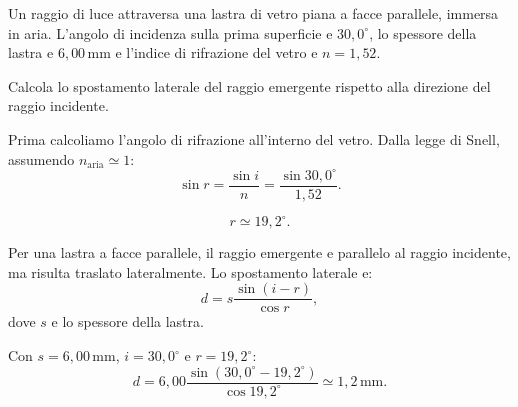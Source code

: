 
\begin{esercizio}
Un raggio di luce attraversa una lastra di vetro piana a facce parallele,
immersa in aria. L'angolo di incidenza sulla prima superficie e
\(30{,}0^\circ\), lo spessore della lastra e \(6{,}00\,\mathrm{mm}\) e
l'indice di rifrazione del vetro e \(n=1{,}52\).

Calcola lo spostamento laterale del raggio emergente rispetto alla direzione
del raggio incidente.
\end{esercizio}

\begin{soluzione}
Prima calcoliamo l'angolo di rifrazione all'interno del vetro. Dalla legge di
Snell, assumendo \(n_\text{aria}\simeq 1\):
\[
\sin r=\frac{\sin i}{n}
=\frac{\sin 30{,}0^\circ}{1{,}52}.
\]

\[
r\simeq 19{,}2^\circ.
\]

Per una lastra a facce parallele, il raggio emergente e parallelo al raggio
incidente, ma risulta traslato lateralmente. Lo spostamento laterale e:
\[
d=s\frac{\sin(i-r)}{\cos r},
\]
dove \(s\) e lo spessore della lastra.

Con \(s=6{,}00\,\mathrm{mm}\), \(i=30{,}0^\circ\) e
\(r=19{,}2^\circ\):
\[
d=6{,}00\frac{\sin(30{,}0^\circ-19{,}2^\circ)}{\cos 19{,}2^\circ}
\simeq 1{,}2\,\mathrm{mm}.
\]
\end{soluzione}
